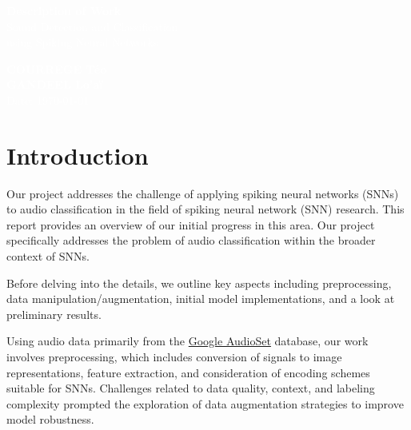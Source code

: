 \documentclass[11pt]{article}
\begin{document}
\pagecolor{darkbluegrey}
\afterpage{\nopagecolor}


\begin{titlepage}
    \begin{center}
        \textcolor{white}{\textbf{\Huge Description of Work}}\\ %
        \vspace{1cm}
        \textcolor{white}{\Large Sound Detection and Classification\\using Spiking Neural Networks} %
        \vspace{3cm}
    \end{center}
    \begin{center}
        \textcolor{white}{ %
            \textbf{COURREGE Téo}\\
            \textbf{GANDEEL Lo'aï}\\
            \vspace{1cm}
            \Large Date: \today}
    \end{center}
\end{titlepage}

\newpage

\tableofcontents

\pagebreak

\section{Introduction}

Our project addresses the challenge of applying spiking neural networks (SNNs) to audio classification in the field of spiking neural network (SNN) research. This report provides an overview of our initial progress in this area. Our project specifically addresses the problem of audio classification within the broader context of SNNs. 

Before delving into the details, we outline key aspects including preprocessing, data manipulation/augmentation, initial model implementations, and a look at preliminary results.

Using audio data primarily from the \href{https://research.google.com/audioset/}{Google AudioSet} database, our work involves preprocessing, which includes conversion of signals to image representations, feature extraction, and consideration of encoding schemes suitable for SNNs. Challenges related to data quality, context, and labeling complexity prompted the exploration of data augmentation strategies to improve model robustness.
\end{document}
